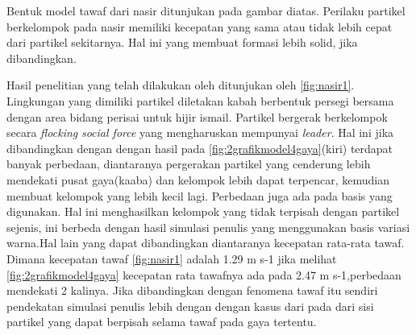 \hspace{0.6cm}Bentuk model tawaf dari nasir\citep{Nasir2016} ditunjukan pada gambar diatas. Perilaku partikel berkelompok pada nasir memiliki kecepatan yang sama atau tidak lebih cepat dari partikel sekitarnya. Hal ini yang membuat formasi lebih solid, jika dibandingkan.

\hspace{0.6cm} Hasil penelitian yang telah dilakukan oleh \citep{Nasir2016} ditunjukan oleh \ref{fig:nasir1}. Lingkungan yang dimiliki partikel diletakan kabah berbentuk persegi bersama dengan area bidang perisai untuk hijir ismail. Partikel bergerak berkelompok secara \textit{flocking} \textit{social force} yang mengharuskan mempunyai \textit{leader}. Hal ini jika dibandingkan dengan dengan hasil pada \ref{fig:2grafikmodel4gaya}(kiri) terdapat banyak perbedaan, diantaranya pergerakan partikel yang cenderung lebih mendekati pusat gaya(kaaba) dan kelompok lebih dapat terpencar, kemudian membuat kelompok yang lebih kecil lagi. Perbedaan juga ada pada basis  yang digunakan. Hal ini menghasilkan kelompok yang tidak terpisah dengan partikel sejenis, ini berbeda dengan hasil simulasi penulis yang menggunakan basis variasi warna.Hal lain yang dapat dibandingkan diantaranya kecepatan rata-rata tawaf. Dimana kecepatan tawaf \ref{fig:nasir1} adalah 1.29 m s-1 \citep{Nasir2016} jika melihat \ref{fig:2grafikmodel4gaya} kecepatan rata tawafnya ada pada 2.47 m s-1,perbedaan mendekati 2 kalinya. Jika dibandingkan dengan fenomena tawaf itu sendiri pendekatan simulasi penulis lebih dengan dengan kasus dari pada \citep{Nasir2016} dari sisi partikel yang dapat berpisah selama tawaf pada gaya tertentu.







%
%


